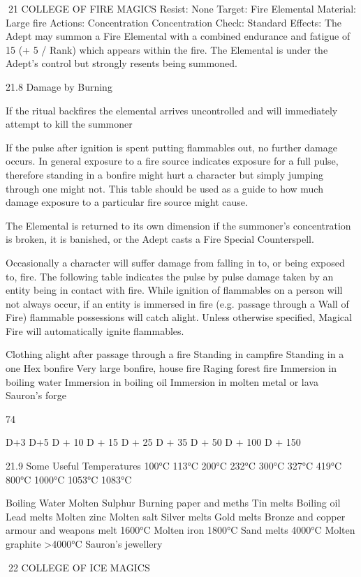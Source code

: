 \documentclass[a4paper]{article}
\begin{document}
\begin{multicols}{3}
21 COLLEGE OF FIRE MAGICS
Resist: None
Target: Fire Elemental
Material: Large fire
Actions: Concentration
Concentration Check: Standard
Effects: The Adept may summon a Fire Elemental
with a combined endurance and fatigue of 15 (+ 5 /
Rank) which appears within the fire. The Elemental is under the Adept’s control but strongly resents
being summoned.

21.8 Damage by Burning

If the ritual backfires the elemental arrives uncontrolled and will immediately attempt to kill the
summoner

If the pulse after ignition is spent putting flammables out, no further damage occurs. In general
exposure to a fire source indicates exposure for a
full pulse, therefore standing in a bonfire might
hurt a character but simply jumping through one
might not. This table should be used as a guide to
how much damage exposure to a particular fire
source might cause.

The Elemental is returned to its own dimension if
the summoner’s concentration is broken, it is banished, or the Adept casts a Fire Special Counterspell.

Occasionally a character will suffer damage from
falling in to, or being exposed to, fire. The following table indicates the pulse by pulse damage taken
by an entity being in contact with fire. While ignition of flammables on a person will not always
occur, if an entity is immersed in fire (e.g. passage
through a Wall of Fire) flammable possessions will
catch alight. Unless otherwise specified, Magical
Fire will automatically ignite flammables.

Clothing alight after passage through
a fire
Standing in campfire
Standing in a one Hex bonfire
Very large bonfire, house fire
Raging forest fire
Immersion in boiling water
Immersion in boiling oil
Immersion in molten metal or lava
Sauron’s forge

74

D+3
D+5
D + 10
D + 15
D + 25
D + 35
D + 50
D + 100
D + 150

21.9 Some Useful Temperatures
100°C
113°C
200°C
232°C
300°C
327°C
419°C
800°C
1000°C
1053°C
1083°C

Boiling Water
Molten Sulphur
Burning paper and meths
Tin melts
Boiling oil
Lead melts
Molten zinc
Molten salt
Silver melts
Gold melts
Bronze and copper armour and weapons
melt
1600°C Molten iron
1800°C Sand melts
4000°C Molten graphite
>4000°C Sauron’s jewellery

22 COLLEGE OF ICE MAGICS


\end{multicols}
\end{document}
